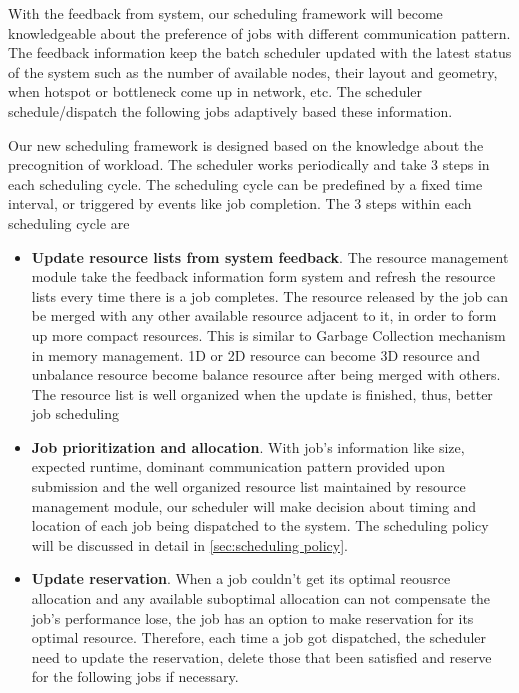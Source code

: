 \documentclass[conference]{IEEEtran}
\begin{document}

With the feedback from system, our scheduling framework will become knowledgeable about the preference of jobs with different communication pattern. The feedback information keep the batch scheduler updated with the latest status of the system such as the number of available nodes, their layout and geometry,  when hotspot or bottleneck come up in network, etc. The scheduler schedule/dispatch the following jobs adaptively based these information.


Our new scheduling framework is designed based on the knowledge about the precognition of workload. The scheduler works periodically and take 3 steps in each scheduling cycle. The scheduling cycle can be predefined by a fixed time interval, or triggered by events like job completion. The 3 steps within each scheduling cycle are

\begin{itemize}

    \item \textbf{Update resource lists from system feedback}. The resource management module take the feedback information form system and refresh the resource lists every time there is a job completes. The resource released by the job can be merged with any other available resource adjacent to it, in order to form up more compact resources. This is similar to Garbage Collection mechanism in memory management. 1D or 2D resource can become 3D resource and unbalance resource become balance resource after being merged with others. The resource list is well organized when the update is finished, thus, better job scheduling 
    
    \item \textbf{Job prioritization and allocation}. With job's information like size, expected runtime, dominant communication pattern provided upon submission and the well organized resource list maintained by resource management module, our scheduler will make decision about timing and location of each job being dispatched to the system. The scheduling policy will be discussed in detail in \ref{sec:scheduling policy}.

    
    \item \textbf{Update reservation}. When a job couldn't get its optimal reousrce allocation and any available suboptimal allocation can not compensate the job's performance lose, the job has an option to make reservation for its optimal resource. Therefore, each time a job got dispatched, the scheduler need to update the reservation, delete those that been satisfied and reserve for the following jobs if necessary.


\end{itemize}
\end{document}
